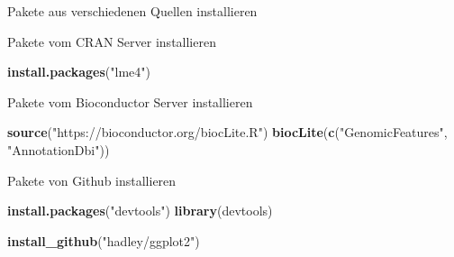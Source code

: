 \documentclass[ignorenonframetext,]{beamer}
\newenvironment{Shaded}{\begin{snugshade}}{\end{snugshade}}
\newcommand{\KeywordTok}[1]{\textcolor[rgb]{0.13,0.29,0.53}{\textbf{#1}}}
\newcommand{\StringTok}[1]{\textcolor[rgb]{0.31,0.60,0.02}{#1}}
\newcommand{\NormalTok}[1]{#1}
\begin{document}
\begin{frame}[fragile]{Pakete aus verschiedenen Quellen installieren}

\begin{block}{Pakete vom CRAN Server installieren}

\begin{Shaded}
\begin{Highlighting}[]
\KeywordTok{install.packages}\NormalTok{(}\StringTok{"lme4"}\NormalTok{)}
\end{Highlighting}
\end{Shaded}

\end{block}

\begin{block}{Pakete vom Bioconductor Server installieren}

\begin{Shaded}
\begin{Highlighting}[]
\KeywordTok{source}\NormalTok{(}\StringTok{"https://bioconductor.org/biocLite.R"}\NormalTok{)}
\KeywordTok{biocLite}\NormalTok{(}\KeywordTok{c}\NormalTok{(}\StringTok{"GenomicFeatures"}\NormalTok{, }\StringTok{"AnnotationDbi"}\NormalTok{))}
\end{Highlighting}
\end{Shaded}

\end{block}

\begin{block}{Pakete von Github installieren}

\begin{Shaded}
\begin{Highlighting}[]
\KeywordTok{install.packages}\NormalTok{(}\StringTok{"devtools"}\NormalTok{)}
\KeywordTok{library}\NormalTok{(devtools)}

\KeywordTok{install_github}\NormalTok{(}\StringTok{"hadley/ggplot2"}\NormalTok{)}
\end{Highlighting}
\end{Shaded}

\end{block}

\end{frame}
\end{document}
